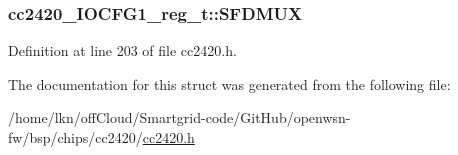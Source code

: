 \subsubsection[{\texorpdfstring{S\+F\+D\+M\+UX}{SFDMUX}}]{ cc2420\+\_\+\+I\+O\+C\+F\+G1\+\_\+reg\+\_\+t\+::\+S\+F\+D\+M\+UX}\hypertarget{structcc2420___i_o_c_f_g1__reg__t_a946e207eb60763f780e34cc91569941c}{}\label{structcc2420___i_o_c_f_g1__reg__t_a946e207eb60763f780e34cc91569941c}


Definition at line 203 of file cc2420.\+h.



The documentation for this struct was generated from the following file\+:\begin{DoxyCompactItemize}
\item 
/home/lkn/off\+Cloud/\+Smartgrid-\/code/\+Git\+Hub/openwsn-\/fw/bsp/chips/cc2420/\hyperlink{cc2420_8h}{cc2420.\+h}\end{DoxyCompactItemize}
